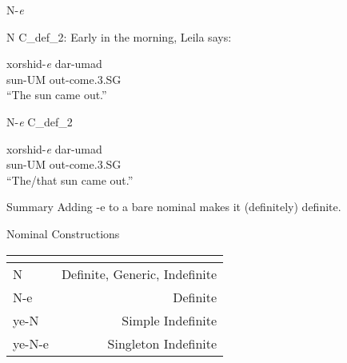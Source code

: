 \documentclass[10pt]{beamer}
\begin{document}

\begin {frame} {N-\emph{{\color {red}e}}}

\begin {exampleblock} {N}
{\small C_{def_2}: Early in the morning, Leila says:}
	\begin {exe}
		\ex \label{bache} \gll	xorshid-\emph{{\color {red}e}}	dar-umad\\
			sun-{\scriptsize UM}	out-come{\scriptsize .3.SG}\\
			``The sun came out.''\\
	\end {exe}
\end {exampleblock}
\pause
\begin {exampleblock} {N-\emph{{\color {red}e}}}
{\small C_{def_2}}
	\begin {exe}
		\ex \label{bache} \gll	xorshid-\emph{{\color {red}e}}	dar-umad\\
			sun-{\scriptsize UM}	out-come{\scriptsize .3.SG}\\
			``The/that sun came out.''\\
	\end {exe}
\end {exampleblock}

\end {frame}


\begin {frame} {Summary}
Adding -{\color {red}e} to a bare nominal makes it (definitely) definite. \\
\end {frame}

\begin {frame} {Nominal Constructions}

\begin {tabular}{l | r}
\multicolumn{2}{c}{} \\\hline
\hspace{0.44cm}N & Definite, Generic, Indefinite\\ \hline
\hspace{0.44cm}N-{\color {red}e} & Definite \\ \hline
\alert{ye-N} & \alert{Simple Indefinite}\\ \hline
\alert{ye-N-{\color {red}e}} & \alert{Singleton Indefinite}\\ \hline
\end {tabular}

\end {frame}
\end{document}
